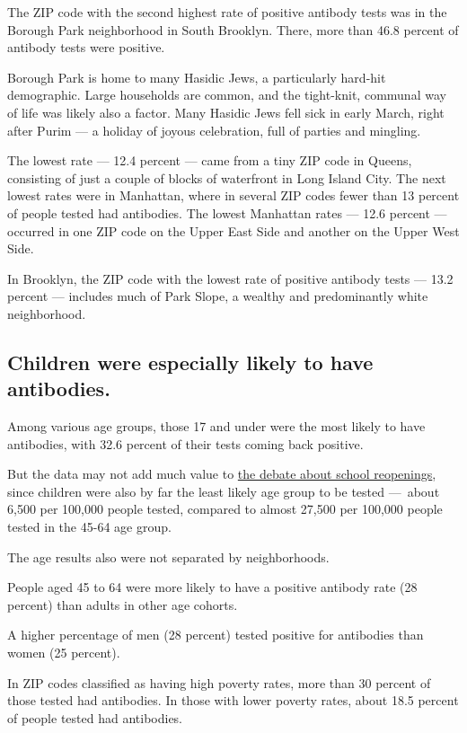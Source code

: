 The ZIP code with the second highest rate of positive antibody tests was
in the Borough Park neighborhood in South Brooklyn. There, more than
46.8 percent of antibody tests were positive.

Borough Park is home to many Hasidic Jews, a particularly hard-hit
demographic. Large households are common, and the tight-knit, communal
way of life was likely also a factor. Many Hasidic Jews fell sick in
early March, right after Purim --- a holiday of joyous celebration, full
of parties and mingling.

The lowest rate --- 12.4 percent --- came from a tiny ZIP code in
Queens, consisting of just a couple of blocks of waterfront in Long
Island City. The next lowest rates were in Manhattan, where in several
ZIP codes fewer than 13 percent of people tested had antibodies. The
lowest Manhattan rates --- 12.6 percent --- occurred in one ZIP code on
the Upper East Side and another on the Upper West Side.

In Brooklyn, the ZIP code with the lowest rate of positive antibody
tests --- 13.2 percent --- includes much of Park Slope, a wealthy and
predominantly white neighborhood.

\hypertarget{children-were-especially-likely-to-have-antibodies}{%
\subsection{Children were especially likely to have
antibodies.}\label{children-were-especially-likely-to-have-antibodies}}

Among various age groups, those 17 and under were the most likely to
have antibodies, with 32.6 percent of their tests coming back positive.

But the data may not add much value to
\href{https://www.nytimes3xbfgragh.onion/2020/08/18/nyregion/schools-reopen-nyc.html}{the
debate about school reopenings}, since children were also by far the
least likely age group to be tested ---~about 6,500 per 100,000 people
tested, compared to almost 27,500 per 100,000 people tested in the 45-64
age group.

The age results also were not separated by neighborhoods.

People aged 45 to 64 were more likely to have a positive antibody rate
(28 percent) than adults in other age cohorts.

A higher percentage of men (28 percent) tested positive for antibodies
than women (25 percent).

In ZIP codes classified as having high poverty rates, more than 30
percent of those tested had antibodies. In those with lower poverty
rates, about 18.5 percent of people tested had antibodies.

